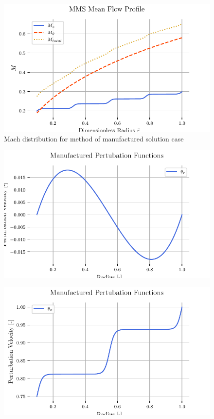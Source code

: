 \documentclass{article}
\begin{document}
%
%


\begin{figure}
    \centering
    \includegraphics[width=\textwidth]{tex-outputs/MMS_mean_flow_profile.pdf}
    \caption{Mach distribution for method of manufactured solution case}
\end{figure}


\begin{figure}
    \centering
    \includegraphics[width=\textwidth]{tex-outputs/MMS_perturbation_variables_vR.pdf}
\end{figure}

\begin{figure}
    \centering
    \includegraphics[width=\textwidth]{tex-outputs/MMS_perturbation_variables_vX.pdf}
\end{figure}
\end{document}
